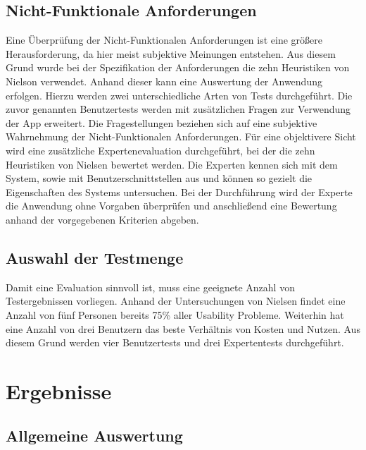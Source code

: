 \subsection{Nicht-Funktionale Anforderungen}
Eine Überprüfung der Nicht-Funktionalen Anforderungen ist eine größere Herausforderung, da hier meist subjektive Meinungen entstehen. Aus diesem Grund wurde bei der Spezifikation der Anforderungen die zehn Heuristiken von Nielson verwendet. Anhand dieser kann eine Auswertung der Anwendung erfolgen. Hierzu werden zwei unterschiedliche Arten von Tests durchgeführt. Die zuvor genannten Benutzertests werden mit zusätzlichen Fragen zur Verwendung der App erweitert. Die Fragestellungen beziehen sich auf eine subjektive Wahrnehmung der Nicht-Funktionalen Anforderungen. Für eine objektivere Sicht wird eine zusätzliche Expertenevaluation durchgeführt, bei der die zehn Heuristiken von Nielsen bewertet werden. Die Experten kennen sich mit dem System, sowie mit Benutzerschnittstellen aus und können so gezielt die Eigenschaften des Systems untersuchen. Bei der Durchführung wird der Experte die Anwendung ohne Vorgaben überprüfen und anschließend eine Bewertung anhand der vorgegebenen Kriterien abgeben. 

\subsection{Auswahl der Testmenge}
Damit eine Evaluation sinnvoll ist, muss eine geeignete Anzahl von Testergebnissen vorliegen. Anhand der Untersuchungen von Nielsen \cite{bib:countTests} findet eine Anzahl von fünf Personen bereits 75\% aller Usability Probleme. Weiterhin hat eine Anzahl von drei Benutzern das beste Verhältnis von Kosten und Nutzen. Aus diesem Grund werden vier Benutzertests und drei Expertentests durchgeführt. 

\section{Ergebnisse}

\subsection{Allgemeine Auswertung}
